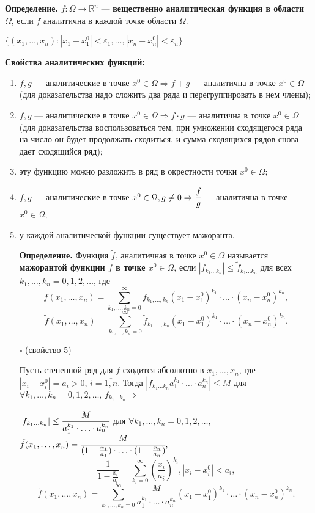 \documentclass[unicode,12pt,draft]{article}
\begin{document}
\textbf{Определение.} $f\colon \Omega \to \mathbb R^n$ ---
\textbf{вещественно аналитическая функция в области $\Omega$},
если $f$ аналитична в каждой точке области $\Omega$.

$\{(x_1,\ldots,x_n)\colon
|x_1-x_1^0|<\varepsilon_1,\ldots,|x_n-x_n^0|<\varepsilon_n\}$

\textbf{Свойства аналитических функций:}
\begin{enumerate}
    \item $f,g$ --- аналитические в точке $x^0\in\Omega \Rightarrow
    f+g$ --- аналитична в точке $x^0\in\Omega$ (для доказательства надо сложить два ряда и перегруппировать в нем
    члены);
    \item $f,g$ --- аналитические в точке $x^0\in\Omega \Rightarrow
    f\cdot g$ --- аналитична в точке $x^0\in\Omega$ (для доказательства воспользоваться тем, при умножении сходящегося ряда на число он будет продолжать сходиться, и сумма сходящихся рядов снова дает сходящийся ряд);
    \item эту функцию можно разложить в ряд в окрестности точки
    $x^0\in\Omega$;
    \item $f,g$ --- аналитические в точке $x^0\in\Omega, g\ne0 \Rightarrow
    \cfrac fg$ --- аналитична в точке $x^0\in\Omega$;
    \item у каждой аналитической функции существует мажоранта.


\textbf{Определение.} Функция $\tilde f$, аналитичная в точке
$x^0\in\Omega$ называется \textbf{мажорантой функции $f$ в точке
$x^0\in\Omega$}, если $|f_{k_1\ldots k_n}|\le \tilde f_{k_1\ldots
k_n}$ для всех $k_1,\ldots,k_n=0,1,2,\ldots$, где
$$f(x_1,\ldots,x_n)=\sum_{k_1,\ldots,k_n=0}^{\infty}f_{k_1,\ldots,k_n}(x_1-x_1^0)^{k_1}\cdot\ldots\cdot(x_n-x_n^0)^{k_n},$$
$$\tilde f(x_1,\ldots,x_n)=\sum_{k_1,\ldots,k_n=0}^{\infty}\tilde
f_{k_1,\ldots,k_n}(x_1-x_1^0)^{k_1}\cdot\ldots\cdot(x_n-x_n^0)^{k_n}.$$

$\square$ (свойство 5)

Пусть степенной ряд для $f$ сходится абсолютно в $x_1,\ldots,x_n$,
где $|x_i-x_i^0|=a_i>0,\,i=\overline{1,n}.$ Тогда $|f_{k_1\ldots
k_n}a_1^{k_1}\cdot\ldots\cdot a_n^{k_n}|\le M$ для $\forall
k_1,\ldots,k_n=0,1,2,\ldots,\,f_{k_1\ldots k_n} \Rightarrow$

$|f_{k_1\ldots k_n}|\le\cfrac M{a_1^{k_1}\cdot\ldots\cdot
a_n^{k_n}}$ для $\forall k_1,\ldots,k_n=0,1,2,\ldots,$ $\tilde
f(x_1,\ldots,x_n)=\cfrac M{(1-\frac{x_1}{a_1})\cdot\ldots\cdot
(1-\frac{x_n}{a_n})},$
$$\frac1{1-\frac{x_i}{a_i}}=\sum_{k_i=0}^{\infty}\left(\frac{x_i}{a_i}\right)^{k_i}, |x_i-x_i^0|<a_i,$$
$$\tilde f(x_1,\ldots,x_n)=\sum_{k_1,\ldots,k_n=0}^{\infty}\frac M{a_1^{k_1}\cdot\ldots\cdot
a_n^{k_n}}(x_1-x_1^0)^{k_1}\cdot\ldots\cdot(x_n-x_n^0)^{k_n}.$$


\end{enumerate}
\end{document}
